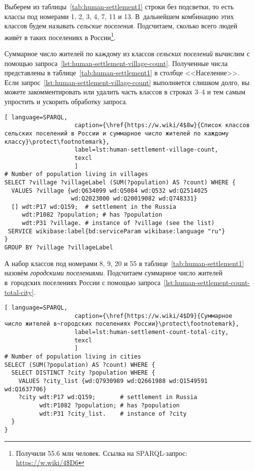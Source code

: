 Выберем из таблицы~\ref{tab:human-settlement1} строки без подсветки, 
то есть классы под номерами 1, 2, 3, 4, 7, 11 и 13. 
В~дальнейшем комбинацию этих классов будем называть \emph{сельские поселения}. 
Подсчитаем, сколько всего людей живёт в таких поселениях в России\footnote{Получили \num{55,6} млн человек. 
Ссылка на SPARQL-запрос: \url{https://w.wiki/4$D6}%
}. 

\newpage
Суммарное число жителей по каждому из классов \emph{сельских поселений} 
вычислим с помощью запроса~\ref{lst:human-settlement-village-count}. 
Полученные числа представлены в таблице~\ref{tab:human-settlement1} в столбце <<Население>>. 
Если запрос~\ref{lst:human-settlement-village-count} выполняется слишком долго, 
вы можете закомментировать или удалить часть классов в строках 3--4 
и тем самым упростить и ускорить обработку запроса. 

\begin{lstlisting}[ language=SPARQL, 
                    caption={\href{https://w.wiki/4$8w}{Список классов сельских поселений в России и суммарное число жителей по каждому классу}\protect\footnotemark},
                    label=lst:human-settlement-village-count,
                    texcl 
                    ]
# Number of population living in villages
SELECT ?village ?villageLabel (SUM(?population) AS ?count) WHERE {  
  VALUES ?village {wd:Q634099 wd:Q5084 wd:Q532 wd:Q2514025 
                   wd:Q2023000 wd:Q20019082 wd:Q748331}
  [] wdt:P17 wd:Q159;  # settlement in the Russia
     wdt:P1082 ?population; # has ?population
     wdt:P31 ?village. # instance of ?village (see the list)
 SERVICE wikibase:label{bd:serviceParam wikibase:language "ru"}
}
GROUP BY ?village ?villageLabel
\end{lstlisting}%



А набор классов под номерами 8, 9, 20 и 55 в таблице~\ref{tab:human-settlement1} 
назовём \emph{городскими поселениями}. 
Подсчитаем суммарное число жителей в~городских поселениях России 
с помощью запроса~\ref{lst:human-settlement-count-total-city}. 


\begin{lstlisting}[ language=SPARQL, 
                    caption={\href{https://w.wiki/4$D9}{Суммарное число жителей в~городских поселениях России}\protect\footnotemark},
                    label=lst:human-settlement-count-total-city,
                    texcl 
                    ]
# Number of population living in cities
SELECT (SUM(?population) AS ?count) WHERE {  
  SELECT DISTINCT ?city ?population WHERE {  
    VALUES ?city_list {wd:Q7930989 wd:Q2661988 wd:Q1549591 wd:Q1637706}
    ?city wdt:P17 wd:Q159;       # settlement in Russia
          wdt:P1082 ?population; # has ?population
          wdt:P31 ?city_list.    # instance of ?city
  }
}
\end{lstlisting}%

